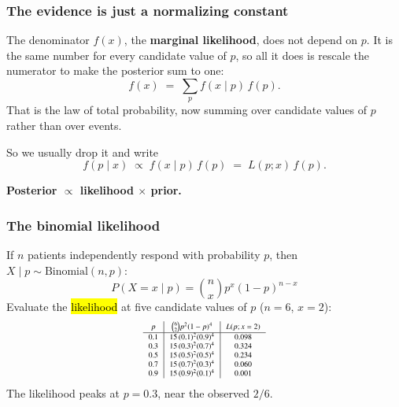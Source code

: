 \documentclass[slidestop,compress,mathserif]{beamer}
\begin{document}
\begin{frame}
\frametitle{The evidence is just a normalizing constant}

The denominator $f(x)$, the \textbf{marginal likelihood}, does not depend on $p$. It is the same number for every candidate value of $p$, so all it does is rescale the numerator to make the posterior sum to one:
\[
f(x) \;=\; \sum_p f(x \mid p)\, f(p).
\]
That is the law of total probability, now summing over candidate values of $p$ rather than over events.

\pause

So we usually drop it and write
\[
f(p \mid x) \;\propto\; f(x \mid p)\, f(p) \;=\; L(p ; x)\, f(p).
\]
\pause
\begin{center}
\textbf{Posterior $\propto$ likelihood $\times$ prior.}
\end{center}

\end{frame}

\begin{frame}
\frametitle{The binomial likelihood}

If $n$ patients independently respond with probability $p$, then $X \mid p \sim \text{Binomial}(n, p)$:
\[
P(X = x \mid p) = \binom{n}{x} p^x (1 - p)^{n - x}
\]
\pause
Evaluate the \hl{likelihood} at five candidate values of $p$ ($n = 6$, $x = 2$):
\[
{\scriptsize
\begin{array}{c|c|c}
p & \binom{6}{2}p^2(1-p)^4 & L(p ; x = 2) \\
\hline
0.1 & 15\,(0.1)^2(0.9)^4 & 0.098 \\
0.3 & 15\,(0.3)^2(0.7)^4 & 0.324 \\
0.5 & 15\,(0.5)^2(0.5)^4 & 0.234 \\
0.7 & 15\,(0.7)^2(0.3)^4 & 0.060 \\
0.9 & 15\,(0.9)^2(0.1)^4 & 0.001 \\
\end{array}}
\]
\vspace{-0.6em}
The likelihood peaks at $p = 0.3$, near the observed $2/6$.

\end{frame}
\end{document}
